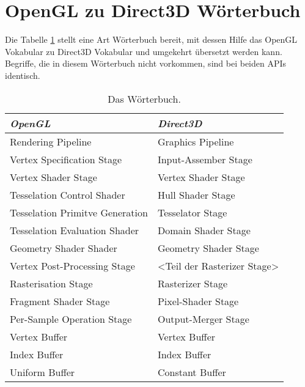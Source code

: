 \section{OpenGL zu Direct3D Wörterbuch}
Die Tabelle \ref{tab:dictionary} stellt eine Art Wörterbuch bereit, mit dessen Hilfe das OpenGL Vokabular zu Direct3D Vokabular und umgekehrt übersetzt werden kann. Begriffe, die in diesem Wörterbuch nicht vorkommen, sind bei beiden APIs identisch.

\begin{table}[tb]
	\centering
    \caption{Das Wörterbuch.}
    \label{tab:dictionary}
    \begin{tabular}{ll}
        \toprule
        \emph{OpenGL}                   & \emph{Direct3D}                                 \\ 
        \midrule                          
        Rendering Pipeline              & Graphics Pipeline                               \\
        Vertex Specification Stage      & Input-Assember Stage                            \\
        Vertex Shader Stage             & Vertex Shader Stage                             \\
        Tesselation Control Shader      & Hull Shader Stage                               \\
        Tesselation Primitve Generation & Tesselator Stage                                \\
        Tesselation Evaluation Shader   & Domain Shader Stage                             \\
        Geometry Shader Shader          & Geometry Shader Stage                           \\
        Vertex Post-Processing Stage    & \textless Teil der Rasterizer Stage\textgreater \\
        Rasterisation Stage             & Rasterizer Stage                                \\ 
        Fragment Shader Stage           & Pixel-Shader Stage                              \\ 
        Per-Sample Operation Stage      & Output-Merger Stage                             \\ 
        Vertex Buffer                   & Vertex Buffer                                   \\ 
        Index Buffer                    & Index Buffer                                    \\ 
        Uniform Buffer                  & Constant Buffer                                 \\ 
        \bottomrule
	\end{tabular}
\end{table}
